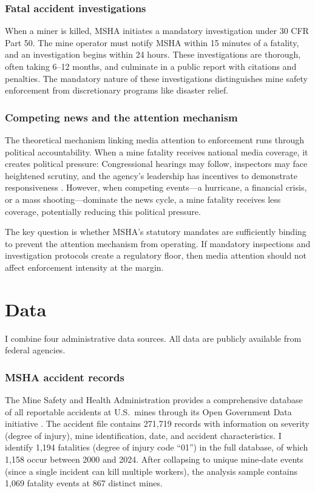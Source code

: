 \documentclass[12pt]{article}
\begin{document}
\subsubsection*{Fatal accident investigations} When a miner is killed, MSHA initiates a mandatory investigation under 30 CFR Part 50. The mine operator must notify MSHA within 15 minutes of a fatality, and an investigation begins within 24 hours. These investigations are thorough, often taking 6--12 months, and culminate in a public report with citations and penalties. The mandatory nature of these investigations distinguishes mine safety enforcement from discretionary programs like disaster relief.

\subsubsection*{Competing news and the attention mechanism} The theoretical mechanism linking media attention to enforcement runs through political accountability. When a mine fatality receives national media coverage, it creates political pressure: Congressional hearings may follow, inspectors may face heightened scrutiny, and the agency's leadership has incentives to demonstrate responsiveness \citep{carpenter2010reputation}. However, when competing events---a hurricane, a financial crisis, or a mass shooting---dominate the news cycle, a mine fatality receives less coverage, potentially reducing this political pressure.

The key question is whether MSHA's statutory mandates are sufficiently binding to prevent the attention mechanism from operating. If mandatory inspections and investigation protocols create a regulatory floor, then media attention should not affect enforcement intensity at the margin.


\section{Data}

I combine four administrative data sources. All data are publicly available from federal agencies.

\subsubsection*{MSHA accident records} The Mine Safety and Health Administration provides a comprehensive database of all reportable accidents at U.S.\ mines through its Open Government Data initiative \citep{msha2024data}. The accident file contains 271,719 records with information on severity (degree of injury), mine identification, date, and accident characteristics. I identify 1,194 fatalities (degree of injury code ``01'') in the full database, of which 1,158 occur between 2000 and 2024. After collapsing to unique mine-date events (since a single incident can kill multiple workers), the analysis sample contains 1,069 fatality events at 867 distinct mines.
\end{document}
